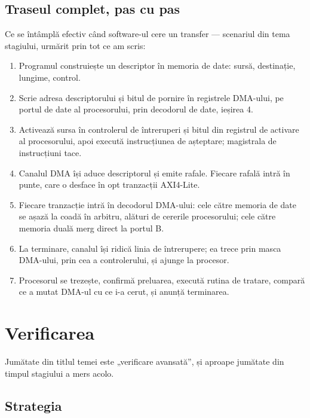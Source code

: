 \documentclass[11pt,openany]{report}
\begin{document}
\section{Traseul complet, pas cu pas}

Ce se întâmplă efectiv când software-ul cere un transfer --- scenariul din tema
stagiului, urmărit prin tot ce am scris:

\begin{enumerate}[itemsep=2pt,topsep=3pt]
\item Programul construiește un descriptor în memoria de date: sursă,
      destinație, lungime, control.
\item Scrie adresa descriptorului și bitul de pornire în registrele DMA-ului,
      pe portul de date al procesorului, prin decodorul de date, ieșirea 4.
\item Activează sursa în controlerul de întreruperi și bitul din registrul de
      activare al procesorului, apoi execută instrucțiunea de așteptare;
      magistrala de instrucțiuni tace.
\item Canalul DMA își aduce descriptorul și emite rafale. Fiecare rafală intră
      în punte, care o desface în opt tranzacții AXI4-Lite.
\item Fiecare tranzacție intră în decodorul DMA-ului: cele către memoria de date
      se așază la coadă în arbitru, alături de cererile procesorului; cele către
      memoria duală merg direct la portul B.
\item La terminare, canalul își ridică linia de întrerupere; ea trece prin masca
      DMA-ului, prin cea a controlerului, și ajunge la procesor.
\item Procesorul se trezește, confirmă preluarea, execută rutina de tratare,
      compară ce a mutat DMA-ul cu ce i-a cerut, și anunță terminarea.
\end{enumerate}

\chapter{Verificarea}
\label{ch:verificare}

Jumătate din titlul temei este „verificare avansată”, și aproape jumătate din
timpul stagiului a mers acolo.

\section{Strategia}
\end{document}
